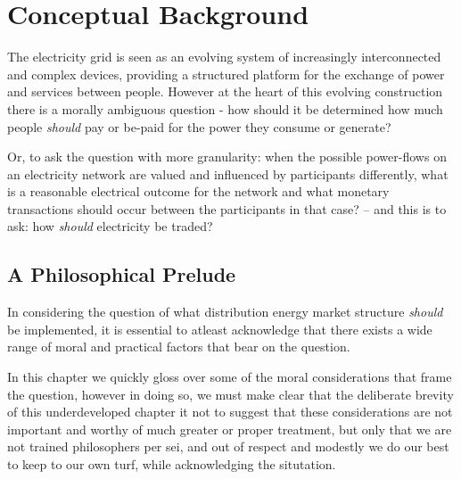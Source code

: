 \section{Conceptual Background}
\label{cha:background}

The electricity grid is seen as an evolving system of increasingly interconnected and complex devices, providing a structured platform for the exchange of power and services between people.
However at the heart of this evolving construction there is a morally ambiguous question - how should it be determined how much people \textit{should} pay or be-paid for the power they consume or generate?

Or, to ask the question with more granularity: when the possible power-flows on an electricity network are valued and influenced by participants differently, 
what is a reasonable electrical outcome for the network and what monetary transactions should occur between the participants in that case? -- and this is to ask: how \textit{should} electricity be traded?\\


\subsection{A Philosophical Prelude}


In considering the question of what distribution energy market structure \textit{should} be implemented, it is essential to atleast acknowledge that there exists a wide range of moral and practical factors that bear on the question.

In this chapter we quickly gloss over some of the moral considerations that frame the question, however in doing so, we must make clear that the deliberate brevity of this underdeveloped chapter it not to suggest that these considerations are not important and worthy of much greater or proper treatment, but only that we are not trained philosophers per sei, and out of respect and modestly we do our best to keep to our own turf, while acknowledging the situtation.

